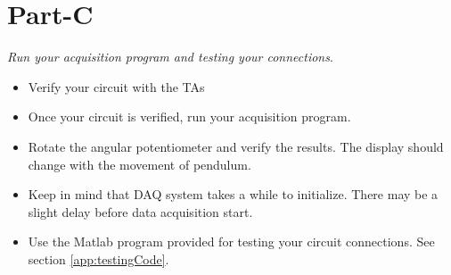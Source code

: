 \documentclass{article} %
\begin{document}
\section{Part-C}
\emph{Run your acquisition program and testing your connections}.
\begin{itemize}
\item Verify your circuit with the TAs
\item Once your circuit is verified, run your acquisition program.
\item Rotate the angular potentiometer and verify the results. The display should change with the movement of pendulum.
\item Keep in mind that DAQ system takes a while to initialize. There may be a slight delay before data acquisition start. 
\item Use the Matlab program provided for testing your circuit connections. See section \ref{app:testingCode}.
\end{itemize}
\clearpage
\end{document}
